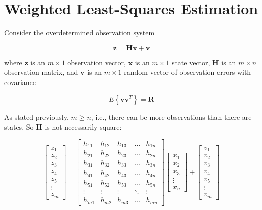 \section{Weighted Least-Squares Estimation}
\label{Weighted Least-Squares Estimation}

Consider the overdetermined observation system

\begin{equation*}
    \mathbf{z} = \mathbf{H} \mathbf{x} + \mathbf{v}
\end{equation*}

where $\mathbf{z}$ is an $m \times 1$ observation vector,
$\mathbf{x}$ is an $m \times 1$ state vector,
$\mathbf{H}$ is an $m \times n$ observation matrix,
and $\mathbf{v}$ is an $m \times 1$ random vector of observation errors with covariance

\begin{equation*}
    E \left\{ \mathbf{v} \mathbf{v}^T \right\} = \mathbf{R}
\end{equation*}

As stated previously, $m \ge n$, i.e., there can be more observations than there are states.
So $\mathbf{H}$ is not necessarily square:

\begin{equation*}
    \begin{bmatrix}
    z_1 \\
    z_2 \\
    z_3 \\
    z_4 \\
    z_5 \\
    \vdots \\
    z_m
    \end{bmatrix}
    =
    \begin{bmatrix}
    h_{11} & h_{12} & h_{13} & \dots & h_{1n} \\
    h_{21} & h_{22} & h_{23} & \dots & h_{2n} \\
    h_{31} & h_{32} & h_{33} & \dots & h_{3n} \\
    h_{41} & h_{42} & h_{43} & \dots & h_{4n} \\
    h_{51} & h_{52} & h_{53} & \dots & h_{5n} \\
    \vdots & \vdots & \vdots & \ddots & \vdots \\
    h_{m1} & h_{m2} & h_{m3} & \dots & h_{mn}
    \end{bmatrix}
    \begin{bmatrix}
    x_1 \\
    x_2 \\
    x_3 \\
    \vdots \\
    x_n
    \end{bmatrix}
    +
    \begin{bmatrix}
    v_1 \\
    v_2 \\
    v_3 \\
    v_4 \\
    v_5 \\
    \vdots \\
    v_m
    \end{bmatrix}
\end{equation*}

